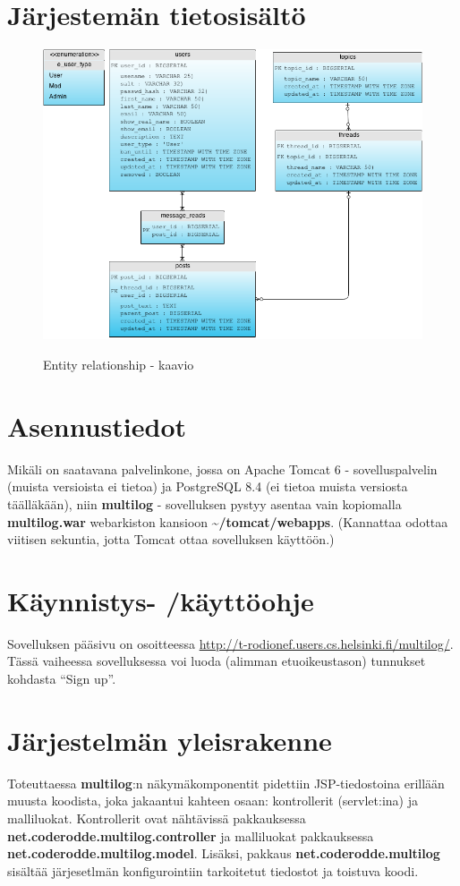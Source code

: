 \documentclass[10pt]{article}
\begin{document}
\section{Järjestemän tietosisältö}
\begin{figure}[H]
  \caption{Entity relationship - kaavio}
  \centering
  \includegraphics[width=\textwidth, keepaspectratio]{ERDiagram}
  \label{fig:erdiagram}
\end{figure}

\section{Asennustiedot}
Mikäli on saatavana palvelinkone, jossa on Apache Tomcat 6 - sovelluspalvelin (muista versioista ei tietoa) ja PostgreSQL 8.4 (ei tietoa muista versiosta täälläkään), niin \textbf{multilog} - sovelluksen pystyy asentaa vain kopiomalla \textbf{multilog.war} webarkiston kansioon \textbf{\textasciitilde/tomcat/webapps}. (Kannattaa odottaa viitisen sekuntia, jotta Tomcat ottaa sovelluksen käyttöön.)

\section{Käynnistys- /käyttöohje}
Sovelluksen pääsivu on osoitteessa \url{http://t-rodionef.users.cs.helsinki.fi/multilog/}.
Tässä vaiheessa sovelluksessa voi luoda (alimman etuoikeustason) tunnukset kohdasta ``Sign up''.

\section{Järjestelmän yleisrakenne}
Toteuttaessa \textbf{multilog}:n näkymäkomponentit pidettiin JSP-tiedostoina erillään muusta koodista, joka jakaantui kahteen osaan: kontrollerit (servlet:ina) ja malliluokat. Kontrollerit ovat nähtävissä pakkauksessa \textbf{net.coderodde.multilog.controller} ja malliluokat pakkauksessa \textbf{net.coderodde.multilog.model}. Lisäksi, pakkaus \textbf{net.coderodde.multilog} sisältää järjesetlmän konfigurointiin tarkoitetut tiedostot ja toistuva koodi.
\end{document}
